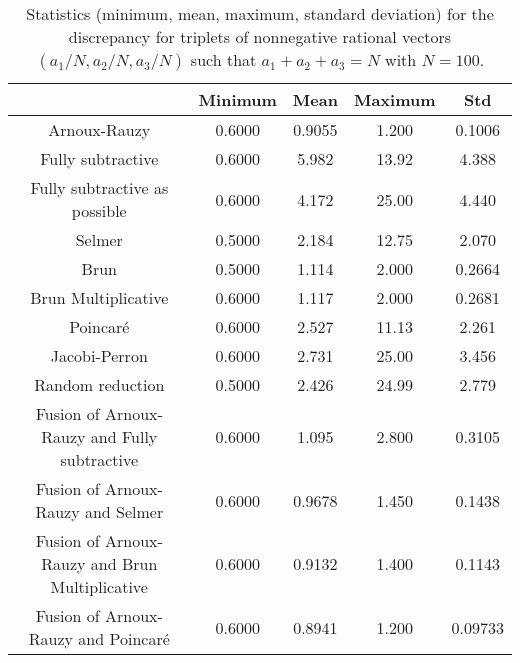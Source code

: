 \documentclass[preliminary,copyright,creativecommons]{eptcs}
\begin{document}
\begin{table}[h]
\begin{tabular}{c|c|c|c|c}
 & Minimum & Mean & Maximum & Std \\ 
\hline
Arnoux-Rauzy & 0.6000 & 0.9055 & 1.200 & 0.1006 \\ 
\hline
Fully subtractive & 0.6000 & 5.982 & 13.92 & 4.388 \\ 
\hline
Fully subtractive as possible & 0.6000 & 4.172 & 25.00 & 4.440 \\ 
\hline
Selmer & 0.5000 & 2.184 & 12.75 & 2.070 \\ 
\hline
Brun & 0.5000 & 1.114 & 2.000 & 0.2664 \\ 
\hline
Brun Multiplicative & 0.6000 & 1.117 & 2.000 & 0.2681 \\ 
\hline
Poincar\'e & 0.6000 & 2.527 & 11.13 & 2.261 \\ 
\hline
Jacobi-Perron & 0.6000 & 2.731 & 25.00 & 3.456 \\ 
\hline
Random reduction & 0.5000 & 2.426 & 24.99 & 2.779 \\ 
\hline
Fusion of Arnoux-Rauzy and Fully subtractive & 0.6000 & 1.095 & 2.800 & 0.3105 \\ 
\hline
Fusion of Arnoux-Rauzy and Selmer & 0.6000 & 0.9678 & 1.450 & 0.1438 \\ 
\hline
Fusion of Arnoux-Rauzy and Brun Multiplicative & 0.6000 & 0.9132 & 1.400 & 0.1143 \\ 
\hline
Fusion of Arnoux-Rauzy and Poincar\'e & 0.6000 & 0.8941 & 1.200 & 0.09733 \\ 
\end{tabular}
 \caption{Statistics (minimum, mean, maximum, standard deviation) for  the  discrepancy    for triplets of  nonnegative rational  vectors   $(a_1/N,a_2/N,a_3/N)$ such that $a_1+a_2+a_3=N$ with  $N=100$.}
\label{table_tijdeman}
\end{table}
\end{document}
